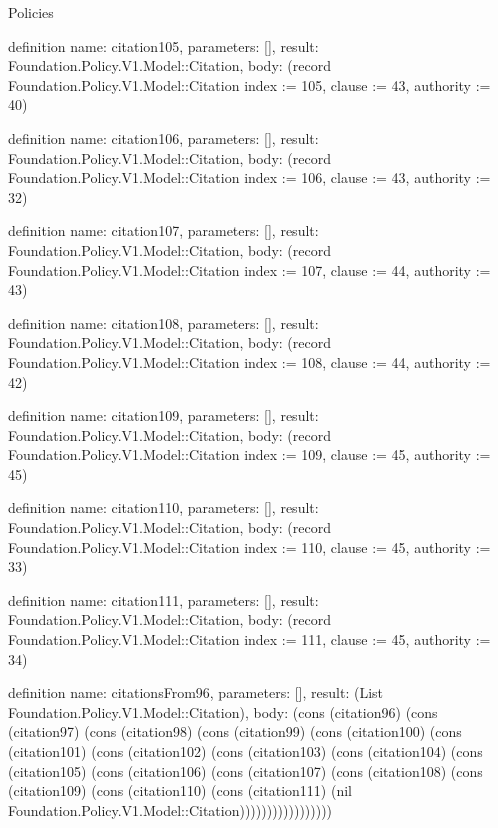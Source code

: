 \begin{lexlean}{Policies}
\begin{semanticmodule}
definition{
  name: citation105,
  parameters: [],
  result: Foundation.Policy.V1.Model::Citation,
  body: (record Foundation.Policy.V1.Model::Citation {index := 105, clause := 43, authority := 40})
}

definition{
  name: citation106,
  parameters: [],
  result: Foundation.Policy.V1.Model::Citation,
  body: (record Foundation.Policy.V1.Model::Citation {index := 106, clause := 43, authority := 32})
}

definition{
  name: citation107,
  parameters: [],
  result: Foundation.Policy.V1.Model::Citation,
  body: (record Foundation.Policy.V1.Model::Citation {index := 107, clause := 44, authority := 43})
}

definition{
  name: citation108,
  parameters: [],
  result: Foundation.Policy.V1.Model::Citation,
  body: (record Foundation.Policy.V1.Model::Citation {index := 108, clause := 44, authority := 42})
}

definition{
  name: citation109,
  parameters: [],
  result: Foundation.Policy.V1.Model::Citation,
  body: (record Foundation.Policy.V1.Model::Citation {index := 109, clause := 45, authority := 45})
}

definition{
  name: citation110,
  parameters: [],
  result: Foundation.Policy.V1.Model::Citation,
  body: (record Foundation.Policy.V1.Model::Citation {index := 110, clause := 45, authority := 33})
}

definition{
  name: citation111,
  parameters: [],
  result: Foundation.Policy.V1.Model::Citation,
  body: (record Foundation.Policy.V1.Model::Citation {index := 111, clause := 45, authority := 34})
}

definition{
  name: citationsFrom96,
  parameters: [],
  result: (List Foundation.Policy.V1.Model::Citation),
  body: (cons (citation96) (cons (citation97) (cons (citation98) (cons (citation99) (cons (citation100) (cons (citation101) (cons (citation102) (cons (citation103) (cons (citation104) (cons (citation105) (cons (citation106) (cons (citation107) (cons (citation108) (cons (citation109) (cons (citation110) (cons (citation111) (nil Foundation.Policy.V1.Model::Citation)))))))))))))))))
}


\end{semanticmodule}
\end{lexlean}
